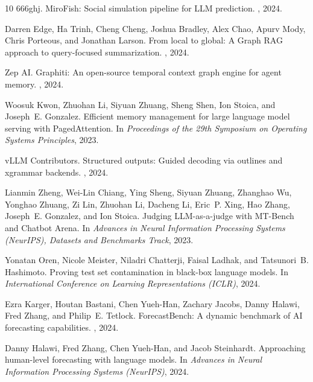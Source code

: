 \documentclass[11pt,journal,onecolumn]{IEEEtran}
\begin{document}
\begin{thebibliography}{10}
666ghj.
\newblock MiroFish: Social simulation pipeline for LLM prediction.
, 2024.

Darren Edge, Ha Trinh, Cheng Cheng, Joshua Bradley, Alex Chao, Apurv Mody, Chris Porteous, and Jonathan Larson.
\newblock From local to global: A Graph RAG approach to query-focused summarization.
, 2024.

Zep AI.
\newblock Graphiti: An open-source temporal context graph engine for agent memory.
, 2024.

Woosuk Kwon, Zhuohan Li, Siyuan Zhuang, Sheng Shen, Ion Stoica, and Joseph~E. Gonzalez.
\newblock Efficient memory management for large language model serving with PagedAttention.
\newblock In {\em Proceedings of the 29th Symposium on Operating Systems Principles}, 2023.

vLLM Contributors.
\newblock Structured outputs: Guided decoding via outlines and xgrammar backends.
, 2024.


Lianmin Zheng, Wei-Lin Chiang, Ying Sheng, Siyuan Zhuang, Zhanghao Wu, Yonghao Zhuang, Zi Lin, Zhuohan Li, Dacheng Li, Eric~P. Xing, Hao Zhang, Joseph~E. Gonzalez, and Ion Stoica.
\newblock Judging LLM-as-a-judge with MT-Bench and Chatbot Arena.
\newblock In {\em Advances in Neural Information Processing Systems (NeurIPS), Datasets and Benchmarks Track}, 2023.

Yonatan Oren, Nicole Meister, Niladri Chatterji, Faisal Ladhak, and Tatsunori~B. Hashimoto.
\newblock Proving test set contamination in black-box language models.
\newblock In {\em International Conference on Learning Representations (ICLR)}, 2024.

Ezra Karger, Houtan Bastani, Chen Yueh-Han, Zachary Jacobs, Danny Halawi, Fred Zhang, and Philip~E. Tetlock.
\newblock ForecastBench: A dynamic benchmark of AI forecasting capabilities.
, 2024.

Danny Halawi, Fred Zhang, Chen Yueh-Han, and Jacob Steinhardt.
\newblock Approaching human-level forecasting with language models.
\newblock In {\em Advances in Neural Information Processing Systems (NeurIPS)}, 2024.

\end{thebibliography}
\end{document}
